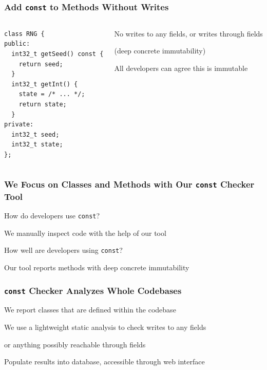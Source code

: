 \documentclass[aspectratio=169]{beamer}
\begin{document}
  \begin{frame}[fragile]
    \frametitle{Add \texttt{const} to Methods Without Writes}

    \begin{columns}
      \begin{column}{0.4\textwidth}
        \begin{lstlisting}
class RNG {
public:
  int32_t getSeed() const {
    return seed;
  }
  int32_t getInt() {
    state = /* ... */;
    return state;
  }
private:
  int32_t seed;
  int32_t state;
};
        \end{lstlisting}
      \end{column}
      \begin{column}{0.5\textwidth}
        No writes to any fields, or writes through fields

        (deep concrete immutability)

        \vspace{1em}

        All developers can agree this is immutable

        \vspace{4em}

      \end{column}
    \end{columns}
  \end{frame}

  \begin{frame}
    \frametitle{We Focus on Classes and Methods with Our \texttt{const} Checker Tool}

    How do developers use \texttt{const}?
    
    \vspace{1em}
    \hspace{1em} We manually inspect code with the help of our tool

    \vspace{4em}

    How well are developers using \texttt{const}?

    \vspace{1em}
    \hspace{1em} Our tool reports methods with deep concrete immutability
  \end{frame}

  \begin{frame}
    \frametitle{\texttt{const} Checker Analyzes Whole Codebases}

    We report classes that are defined within the codebase

    \vspace{2em}

    We use a lightweight static analysis to check writes to any
    fields

    \hspace{1em} or anything possibly reachable through fields

    \vspace{2em}

    Populate results into database, accessible through web interface
  \end{frame}
\end{document}
